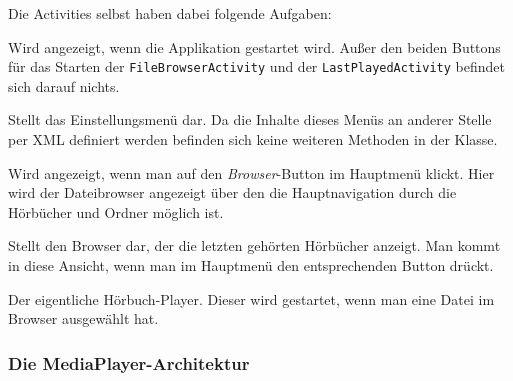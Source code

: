 Die Activities selbst haben dabei folgende Aufgaben:

\begin{description}[style=nextline]
	\item[MainActivity] Wird angezeigt, wenn die Applikation gestartet wird. Außer den beiden Buttons für das Starten der \verb+FileBrowserActivity+ und der \verb+LastPlayedActivity+ befindet sich darauf nichts.
	\item[SettingsActivity] Stellt das Einstellungsmenü dar. Da die Inhalte dieses Menüs an anderer Stelle per XML definiert werden befinden sich keine weiteren Methoden in der Klasse.
	\item[FileBrowserActivity] Wird angezeigt, wenn man auf den \emph{Browser}-Button im Hauptmenü klickt. Hier wird der Dateibrowser angezeigt über den die Hauptnavigation durch die Hörbücher und Ordner möglich ist.
	\item[LastPlayedActivity] Stellt den Browser dar, der die letzten gehörten Hörbücher anzeigt. Man kommt in diese Ansicht, wenn man im Hauptmenü den entsprechenden Button drückt.
	\item[PlayerActivity] Der eigentliche Hörbuch-Player. Dieser wird gestartet, wenn man eine Datei im Browser ausgewählt hat.
\end{description}

\subsubsection{Die MediaPlayer-Architektur}

